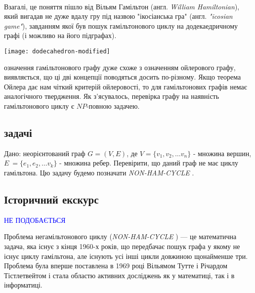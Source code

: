 \documentclass[14pt]{article}
\begin{document}
\begin{spacing}{1.175}
        \\
        \quad Взагалі, це поняття пішло від Вільям Гамільтон (англ. \textit{William Hamiltonian}), який вигадав не дуже вдалу гру під назвою "ікосіанська гра" (англ. \textit{"icosian game"}), завданням якої був пошук гамільтонового циклу на додекаедричному графі (і можливо на його підграфах). \\
        \begin{center}
        \texttt{[image: dodecahedron-modified]} \\
        \end{center}
        
         означення гамільтонового графу дуже схоже з означенням ойлерового графу, виявляється, що ці дві концепції поводяться досить по-різному. Якщо теорема Ойлера дає нам чіткий критерій ойлеровості, то для гамільтонових графів немає аналогічного твердження. Як з'ясувалось, перевірка графу на наявність гамільтонового циклу є \(NP\)-повною задачею.

        \newcommand{\nonhamcycle}{\textit{NON-HAM-CYCLE }}
        \newcommand{\hamcycle}{\textit{HAM-CYCLE }}
        \newcommand{\dhampath}{\textit{D-HAM-PATH }}
        \newcommand{\tsat}{\textit{3SAT }}

        
        \subsection{ задачі}
        \quad Дано: неорієнтований граф \(G = (V,E)\), де \(V = \{v_1, v_2, \dots v_n\}\) - множина вершин, \(E\ = \{e_1, e_2, \dots v_k\}\) - множина ребер. Перевірити, що даний граф не має циклу гамільтона. Цю задачу будемо позначати \nonhamcycle .    
        \subsection{\normalfont Історичний екскурс}
        \textcolor{blue}{НЕ ПОДОБАЄТЬСЯ}
        
        Проблема негамільтонового циклу (\nonhamcycle) — це математична задача, яка існує з кінця 1960-х років, що передбачає пошук графа у якому не існує циклу гамільтона, але існують усі інші цикли довжиною щонайменше три. Проблема була вперше поставлена в 1969 році Вільямом Тутте і Річардом Тістлетвейтом і стала областю активних досліджень як у математиці, так і в інформатиці.


\end{spacing}
\end{document}
